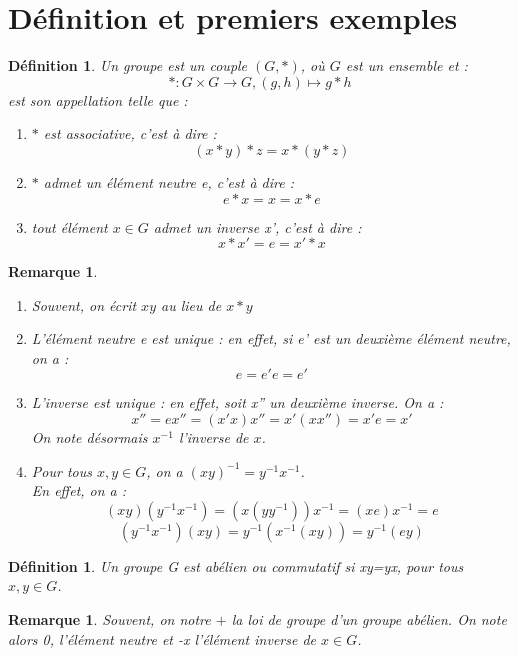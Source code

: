 \documentclass[a4paper, oneside]{report}
\theoremstyle{break}
\newtheorem{defi}[thm]{Définition}
\newtheorem{remar}[thm]{Remarque}
\newcommand{\x}{\times}
\begin{document}
\section{Définition et premiers exemples}

\begin{defi}
	Un groupe est un couple $(G,*)$, où $G$ est un ensemble et :
	$$*:G\x G \rightarrow G, (g,h)\mapsto g*h$$
	est son appellation telle que :
	\begin{enumerate}
		\item $*$ est associative, c'est à dire :
		$$(x*y)*z=x*(y*z)$$
		\item $*$ admet un élément neutre e, c'est à dire :
		$$e*x = x = x*e$$
		\item tout élément $x\in G$ admet un inverse x', c'est à dire :
		$$x*x'=e=x'*x$$
	\end{enumerate}	
\end{defi}

\begin{remar}
	\begin{enumerate}
		\item Souvent, on écrit $xy$ au lieu de $x*y$\\
		\item L'élément neutre e est unique : en effet, si e' est un deuxième élément neutre, on a :
		$$ e = e'e = e'$$
		\item L'inverse est unique : en effet, soit x'' un deuxième inverse. On a :
		$$x''=ex''=(x'x)x''=x'(xx'')=x'e=x'$$
		On note désormais $x^{-1}$ l'inverse de $x$.\\
		\item Pour tous $x,y\in G$, on a $(xy)^{-1}=y^{-1}x^{-1}$.\\
		En effet, on a :
		$$(xy)(y^{-1}x^{-1})=(x(yy^{-1}))x^{-1} = (xe)x^{-1}=e$$
		$$(y^{-1}x^{-1})(xy)=y^{-1}(x^{-1}(xy))=y^{-1}(ey)$$
	\end{enumerate}	
\end{remar}

\begin{defi}
	Un groupe G est abélien ou commutatif si xy=yx, pour tous $x,y\in G$.	
\end{defi}

\begin{remar}
	Souvent, on notre $+$ la loi de groupe d'un groupe abélien. On note alors 0, l'élément neutre et -x l'élément inverse de $x\in G$.	
\end{remar}
\end{document}
